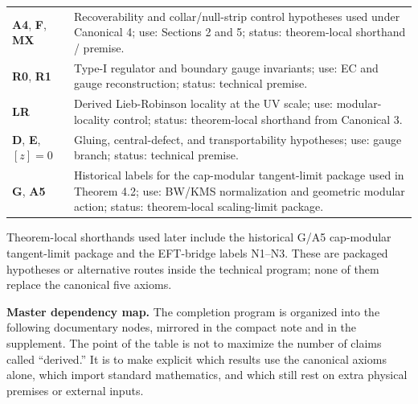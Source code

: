 {\begin{longtable}{@{}>{\RaggedRight\arraybackslash}p{}>{\RaggedRight\arraybackslash}p{}@{}}
\textbf{A4}, \textbf{F}, \textbf{MX} & Recoverability and collar/null-strip control hypotheses used under Canonical 4; use: Sections 2 and 5; status: theorem-local shorthand / premise. \\
\textbf{R0}, \textbf{R1} & Type-I regulator and boundary gauge invariants; use: EC and gauge reconstruction; status: technical premise. \\
\textbf{LR} & Derived Lieb-Robinson locality at the UV scale; use: modular-locality control; status: theorem-local shorthand from Canonical 3. \\
\textbf{D}, \textbf{E}, \([z]=0\) & Gluing, central-defect, and transportability hypotheses; use: gauge branch; status: technical premise. \\
\textbf{G}, \textbf{A5} & Historical labels for the cap-modular tangent-limit package used in Theorem 4.2; use: BW/KMS normalization and geometric modular action; status: theorem-local scaling-limit package. \\
\end{longtable}
}

Theorem-local shorthands used later include the historical G/A5 cap-modular tangent-limit package and the EFT-bridge labels N1--N3. These are packaged hypotheses or alternative routes inside the technical program; none of them replace the canonical five axioms.

\textbf{Master dependency map.} The completion program is organized into the following documentary nodes, mirrored in the compact note and in the supplement. The point of the table is not to maximize the number of claims called ``derived.'' It is to make explicit which results use the canonical axioms alone, which import standard mathematics, and which still rest on extra physical premises or external inputs.

